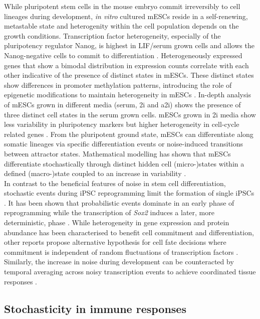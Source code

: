 While pluripotent stem cells in the mouse embryo commit irreversibly to cell lineages during development, \emph{in vitro} cultured \glspl{mESC} reside in a self-renewing, metastable state \citep{Hayashi2013} and heterogenity within the cell population depends on the growth conditions. Transcription factor heterogeneity, especially of the pluripotency regulator Nanog, is highest in \gls{LIF}/serum grown cells and allows the Nanog-negative cells to commit to differentiation \citep{Chickarmane2012, Torres-Padilla2014}. Heterogeneously expressed genes that show a bimodal distribution in expression counts correlate with each other indicative of the presence of distinct states in mESCs. These distinct states show differences in promoter methylation patterns, introducing the role of epigenetic modifications to maintain heterogeneity in mESCs \citep{Singer2014}. In-depth analysis of mESCs grown in different media (serum, \gls{2i} and \gls{a2i}) shows the presence of three distinct cell states in the serum grown cells. mESCs grown in 2i media show less variability in pluripotency markers but higher heterogeneity in cell-cycle related genes \citep{Kolodziejczyk2015cell}. From the pluripotent ground state, mESCs can differentiate along somatic lineages via specific differentiation events or noise-induced transitions between attractor states. Mathematical modelling has shown that mESCs differentiate stochastically through distinct hidden cell (micro-)states within a defined (macro-)state coupled to an increase in variability \cite{Stumpf2017}.\\

In contrast to the beneficial features of noise in stem cell differentiation, stochastic events during \gls{iPSC} reprogramming limit the formation of single iPSCs \citep{Hanna2009, Yamanaka2009}. It has been shown that probabilistic events dominate in an early phase of reprogramming while the transcription of \textit{Sox2} induces a later, more deterministic, phase \cite{Buganim2012}. While heterogeneity in gene expression and protein abundance has been characterised to benefit cell commitment and differentiation, other reports propose alternative hypothesis for cell fate decisions where commitment is independent of random fluctuations of transcription factors \cite{Hoppe2016}. Similarly, the increase in noise during development can be counteracted by temporal averaging across noisy transcription events to achieve coordinated tissue responses \citep{Stapel2017}. 

\subsection{Stochasticity in immune responses}

